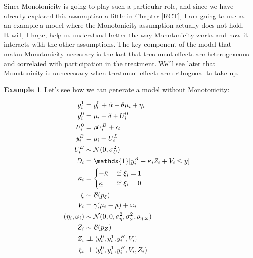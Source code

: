 \documentclass[
]{book}
\newcommand{\uns}[1]{\mathds{1}[ #1 ]}
\newcommand\Ind{\protect\mathpalette{\protect\independenT}{\perp}}
\def\independenT#1#2{\mathrel{\setbox0\hbox{$#1#2$}\copy0\kern-\wd0\mkern4mu\box0}}
\theoremstyle{definition}
\theoremstyle{definition}
\newtheorem{example}{Example}[chapter]
\theoremstyle{definition}
\theoremstyle{definition}
\theoremstyle{remark}
\begin{document}
Since Monotonicity is going to play such a particular role, and since we have already explored this assumption a little in Chapter \ref{RCT}, I am going to use as an example a model where the Monotonicity assumption actually does not hold.
It will, I hope, help us understand better the way Monotonicity works and how it interacts with the other assumptions.
The key component of the model that makes Monotonicity necessary is the fact that treatment effects are heterogeneous and correlated with participation in the treatment.
We'll see later that Monotonicity is unnecessary when treatment effects are orthogonal to take up.

\begin{example}
\protect\hypertarget{exm:unnamed-chunk-139}{}{\label{exm:unnamed-chunk-139} }Let's see how we can generate a model without Monotonicity:
\end{example}

\begin{align*}
y_i^1 & = y_i^0+\bar{\alpha}+\theta\mu_i+\eta_i \\
y_i^0 & = \mu_i+\delta+U_i^0 \\
U_i^0 & = \rho U_i^B+\epsilon_i \\
y_i^B & =\mu_i+U_i^B \\
U_i^B & \sim\mathcal{N}(0,\sigma^2_{U}) \\
D_i   & = \uns{y_i^B+\kappa_i Z_i + V_i\leq\bar{y}} \\
\kappa_i & = 
\begin{cases}
-\bar{\kappa} & \text{ if } \xi_i = 1 \\
\underline{\kappa} & \text{ if } \xi_i = 0
\end{cases} \\
\xi & \sim\mathcal{B}(p_{\xi}) \\
V_i   & = \gamma(\mu_i-\bar{\mu}) + \omega_i \\
(\eta_i,\omega_i) & \sim\mathcal{N}(0,0,\sigma^2_{\eta},\sigma^2_{\omega},\rho_{\eta,\omega}) \\
Z_i   & \sim\mathcal{B}(p_Z) \\
Z_i   & \Ind (y_i^0,y_i^1,y_i^B,V_i) \\
\xi_i & \Ind (y_i^0,y_i^1,y_i^B,V_i,Z_i)
\end{align*}
\end{document}
